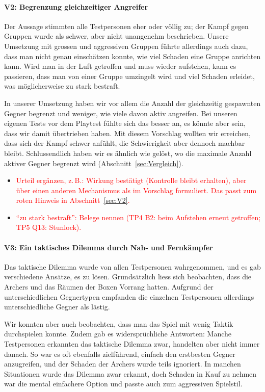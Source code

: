 \documentclass[../Main.tex]{subfiles}
\begin{document}
\paragraph{V2: Begrenzung gleichzeitiger Angreifer}
Der Aussage stimmten alle Testpersonen eher oder völlig zu; der Kampf gegen Gruppen wurde als schwer, aber nicht unangenehm beschrieben. Unsere Umsetzung mit grossen und aggressiven Gruppen führte allerdings auch dazu, dass man nicht genau einschätzen konnte, wie viel Schaden eine Gruppe anrichten kann. Wird man in der Luft getroffen und muss wieder aufstehen, kann es passieren, dass man von einer Gruppe umzingelt wird und viel Schaden erleidet, was möglicherweise zu stark bestraft.

In unserer Umsetzung haben wir vor allem die Anzahl der gleichzeitig gespawnten Gegner begrenzt und weniger, wie viele davon aktiv angreifen. Bei unseren eigenen Tests vor dem Playtest fühlte sich das besser an, es könnte aber sein, dass wir damit übertrieben haben. Mit diesem Vorschlag wollten wir erreichen, dass sich der Kampf schwer anfühlt, die Schwierigkeit aber dennoch machbar bleibt. Schlussendlich haben wir es ähnlich wie  gelöst, wo die maximale Anzahl aktiver Gegner begrenzt wird (Abschnitt~\ref{sec:Vergleich}).

\begin{itemize}[leftmargin=1.5cm]
    \item \textcolor{red}{Urteil ergänzen, z.\,B.: Wirkung bestätigt (Kontrolle bleibt erhalten), aber über einen anderen Mechanismus als im Vorschlag formuliert. Das passt zum roten Hinweis in Abschnitt~\ref{sec:V2}.}
    \item \textcolor{red}{\enquote{zu stark bestraft}: Belege nennen (TP4 B2: beim Aufstehen erneut getroffen; TP5 Q13: Stunlock).}
\end{itemize}

\paragraph{V3: Ein taktisches Dilemma durch Nah- und Fernkämpfer}
Das taktische Dilemma wurde von allen Testpersonen wahrgenommen, und es gab verschiedene Ansätze, es zu lösen. Grundsätzlich liess sich beobachten, dass die Archers und das Räumen der Boxen Vorrang hatten. Aufgrund der unterschiedlichen Gegnertypen empfanden die einzelnen Testpersonen allerdings unterschiedliche Gegner als lästig.

Wir konnten aber auch beobachten, dass man das Spiel mit wenig Taktik durchspielen konnte. Zudem gab es widersprüchliche Antworten: Manche Testpersonen erkannten das taktische Dilemma zwar, handelten aber nicht immer danach. So war es oft ebenfalls zielführend, einfach den erstbesten Gegner anzugreifen, und der Schaden der Archers wurde teils ignoriert. In manchen Situationen wurde das Dilemma zwar erkannt, doch Schaden in Kauf zu nehmen war die mental einfachere Option und passte auch zum aggressiven Spielstil.
\end{document}

